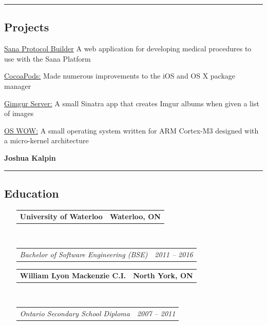\documentclass[10pt,letterpaper]{article}
\makeatletter
\newenvironment{indentsection}[1]%
{\begin{list}{}%
	{\setlength{\leftmargin}{#1}}%
	\item[]%
}
{\end{list}}
\newcommand{\headerrow}[2]
{\begin{tabular*}{\linewidth}{l@{\extracolsep{\fill}}r}
	#1 &
	#2 \\
\end{tabular*}}
\makeatother
\begin{document}
\hrule
\vspace{-0.4em}
\subsection*{Projects}
	\begin{indentsection}{\parindent}
	\begin{description*}
	    \item[\href{https://github.com/SanaMobile/sana.protocol_builder}{Sana Protocol Builder}] A web application for developing medical procedures to use with the Sana Platform
	    \item[\href{https://github.com/CocoaPods}{CocoaPods:}] Made numerous improvements to the iOS and OS X package manager
		\item[\href{https://github.com/Kapin/gimgur-server}{Gimgur Server:}] A small Sinatra app that creates Imgur albums when given a list of images
		\item[\href{https://github.com/Trinovantes/se350-project}{OS WOW:}] A small operating system written for ARM Cortex-M3 designed with a micro-kernel architecture
	\end{description*}
	\end{indentsection}

\newpage	
	
\begin{center}
{\LARGE \textbf{Joshua Kalpin}}
\vspace{0.1cm}
\end{center}


\hrule
\vspace{-0.4em}
\subsection*{Education}

\begin{itemize}[leftmargin=*]
	\parskip=0.1em

	\item[] 
	\headerrow
		{\textbf{University of Waterloo}}
		{\textbf{Waterloo, ON}}
	\\
	\headerrow
		{\emph{Bachelor of Software Engineering (BSE)}}
		{\emph{2011 -- 2016}}
		
        
        
        \item[] 
	\headerrow
		{\textbf{William Lyon Mackenzie C.I.}}
		{\textbf{North York, ON}}
	\\
	\headerrow
		{\emph{Ontario Secondary School Diploma}}
		{\emph{2007 -- 2011}}
\end{itemize}
\end{document}
